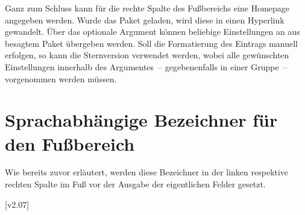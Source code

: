 \begin{DeclareEntity}{}
\begin{Declaration}
  {}
\begin{Declaration}
  {}
\printdeclarationlist

Ganz zum Schluss kann für die rechte Spalte des Fußbereichs eine Homepage 
angegeben werden. Wurde das Paket  geladen, wird diese in 
einen Hyperlink gewandelt. Über das optionale Argument können beliebige 
Einstellungen an  aus besagtem Paket 
übergeben werden. Soll die Formatierung des Eintrags manuell erfolgen, so kann 
die Sternversion  verwendet werden, wobei alle gewünschten 
Einstellungen innerhalb des Argumentes~-- gegebenenfalls in einer Gruppe~-- 
vorgenommen werden müssen.
\end{Declaration}
\end{Declaration}
%



\section{Sprachabhängige Bezeichner für den Fußbereich}

\begin{Declaration}
  {}
\begin{Declaration}
  {}
\begin{Declaration}
  {}
\printdeclarationlist[Bezeichner|!]

Wie bereits zuvor erläutert, werden diese Bezeichner in der linken respektive 
rechten Spalte im Fuß vor der Ausgabe der eigentlichen Felder gesetzt.
%
\end{Declaration}
\end{Declaration}
\end{Declaration}

[v2.07]
\end{DeclareEntity}

